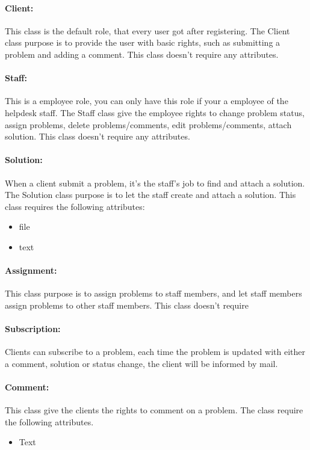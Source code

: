  \paragraph{Client:}This class is the default role, that every user got after registering. The Client class purpose is to provide the user with basic rights, such as submitting a problem and adding a comment. This class doesn't require any attributes.

 \paragraph{Staff:}This is a employee role, you can only have this role if your a employee of the helpdesk staff. The Staff class give the employee rights to change problem status, assign problems, delete problems/comments, edit problems/comments, attach solution. This class doesn't require any attributes.

 \paragraph{Solution:}When a client submit a problem, it's the staff's job to find and attach a solution. The Solution class purpose is to let the staff create and attach a solution. This class requires the following attributes:
\begin{itemize}
 \item{file}
 \item{text}
\end{itemize}

 \paragraph{Assignment:}This class purpose is to assign problems to staff members, and let staff members assign problems to other staff members. This class doesn't require 

 \paragraph{Subscription:}Clients can subscribe to a problem, each time the problem is updated with either a comment, solution or status change, the client will be informed by mail.

 \paragraph{Comment:}This class give the clients the rights to comment on a problem. The class require the following attributes.
\begin{itemize}
 \item{Text}
\end{itemize}
 
